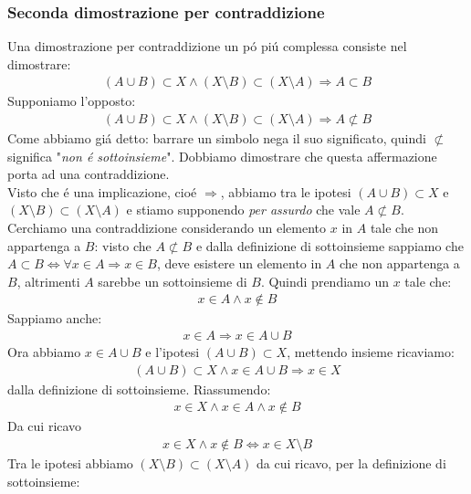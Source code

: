 \documentclass[twoside]{article} %
\begin{document}
	\subsubsection{Seconda dimostrazione per contraddizione}
	Una dimostrazione per contraddizione un p\'o pi\'u complessa consiste nel dimostrare:
	\begin{gather*}
		(A\cup B)\subset X \wedge (X\setminus B)\subset (X\setminus A)\Rightarrow A\subset B
	\end{gather*}
	Supponiamo l'opposto:
	\begin{gather*}
		(A\cup B)\subset X \wedge (X\setminus B)\subset (X\setminus A)\Rightarrow A\not\subset B
	\end{gather*}
	Come abbiamo gi\'a detto: barrare un simbolo nega il suo significato, quindi $\not \subset$ significa "\textit{non \'e sottoinsieme}". Dobbiamo dimostrare che questa affermazione porta ad una contraddizione.\\
	Visto che \'e una implicazione, cio\'e $\Rightarrow$, abbiamo tra le ipotesi $(A\cup B)\subset X$ e $(X\setminus B)\subset (X\setminus A)$ e stiamo supponendo \textit{per assurdo} che vale $A\not\subset B$. Cerchiamo una contraddizione considerando un elemento $x$ in $A$ tale che non appartenga a $B$: visto che $A\not \subset B$ e dalla definizione di sottoinsieme sappiamo che $A\subset B\Leftrightarrow \forall x\in A\Rightarrow x\in B$, deve esistere un elemento in $A$ che non appartenga a $B$, altrimenti $A$ sarebbe un sottoinsieme di $B$. Quindi prendiamo un $x$ tale che: 
	\begin{gather*}
		x\in A\wedge x\notin B
	\end{gather*}
	Sappiamo anche:
	\begin{gather*}
		x\in A \Rightarrow x\in A\cup B
	\end{gather*}		
	 Ora abbiamo $x\in A\cup B$ e l'ipotesi $(A\cup B)\subset X$, mettendo insieme ricaviamo:
	 \begin{gather*}
	 	(A\cup B)\subset X \wedge x\in A\cup B\Rightarrow x\in X
	 \end{gather*}
	 dalla definizione di sottoinsieme. Riassumendo:
	 \begin{gather*}
	 	x\in X\wedge x\in A\wedge x\notin B
	 \end{gather*}
	 Da cui ricavo
	 \begin{gather*}
	 	x\in X\wedge x\notin B\Leftrightarrow x\in X\setminus B
	 \end{gather*}
	 Tra le ipotesi abbiamo $(X\setminus B)\subset (X\setminus A)$ da cui ricavo, per la definizione di sottoinsieme:
\end{document}
